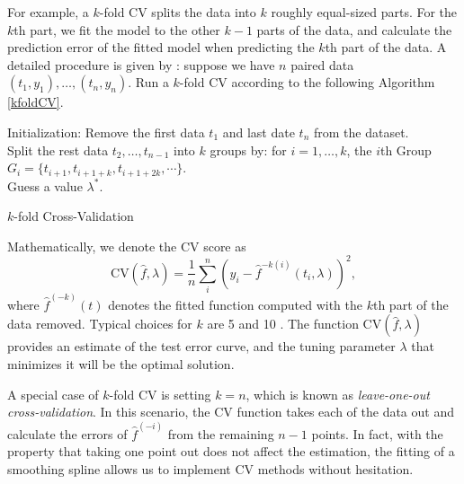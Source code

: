 For example, a $k$-fold CV splits the data into $k$ roughly equal-sized parts. For the $k$th part, we fit the model to the other $k-1$ parts of the data, and calculate the prediction error of the fitted model when predicting the $k$th part of the data. A detailed procedure is given by \cite{wahba1975completely}: suppose we have $n$ paired data $(t_1,y_1), \ldots, (t_n,y_n)$. Run a $k$-fold CV according to the following Algorithm \ref{kfoldCV}. 
\begin{algorithm}[h]
\SetAlgoLined 
Initialization: Remove the first data $t_1$ and last date $t_n$ from the dataset. \\
Split the rest data $t_2,\ldots,t_{n-1}$ into $k$ groups by: for $i=1,\ldots,k$, the $i$th Group $G_i=\{t_{i+1}, t_{i+1+k}, t_{i+1+2k}, \cdots\}$.\\
Guess a value $\lambda^*$. \\
\caption{$k$-fold Cross-Validation}\label{kfoldCV}
\end{algorithm}
Mathematically, we denote the CV score as 
\begin{equation*}
\mbox{CV}(\hat{f},\lambda) = \frac{1}{n}\sum_i^n \left( y_i -\hat{f}^{-k(i)}(t_i,\lambda) \right)^2,
\end{equation*}
where $\hat{f}^{(-k)}(t)$ denotes the fitted function computed with the $k$th part of the data removed. Typical choices for $k$ are 5 and 10 \citep{esl2009}.  The function $\mbox{CV}(\hat{f},\lambda)$ provides an estimate of the test error curve, and the tuning parameter $\lambda$ that minimizes it will be the optimal solution. 

A special case of $k$-fold CV is setting $k=n$, which is known as \textit{leave-one-out cross-validation}. In this scenario, the CV function takes each of the data out and calculate the errors of $\hat{f}^{(-i)}$ from the remaining $n-1$ points. In fact, with the property that taking one point out does not affect the estimation, the fitting of a smoothing spline allows us to implement CV methods without hesitation. 

